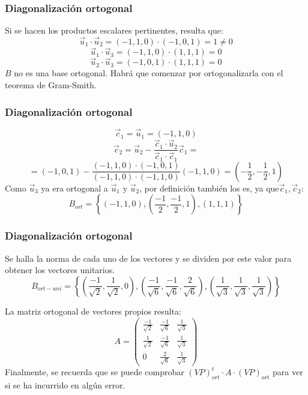 \documentclass{beamer}
\begin{document}
\begin{frame}
\frametitle{Diagonalizaci\'on ortogonal}
Si se hacen los productos escalares pertinentes, resulta que:
\[\vec u_1 \cdot \vec u_2 = (-1,1,0)\cdot (-1,0,1) = 1\neq 0\]
\[\vec u_1 \cdot \vec u_3 = (-1,1,0)\cdot (1,1,1) = 0\]
\[\vec u_2 \cdot \vec u_3 = (-1,0,1)\cdot (1,1,1) = 0\]
$B$ no es una base ortogonal. Habr\'a que comenzar por ortogonalizarla con el teorema de Gram-Smith.

\end{frame}



\begin{frame}
\frametitle{Diagonalizaci\'on ortogonal}
\[\vec c_1 = \vec u_1 = (-1,1,0)\]
\[\vec c_2 = \vec u_2  - \frac{\vec c_1\cdot \vec u_2}{\vec c_1\cdot \vec c_1} \vec c_1 = \]
\[= (-1,0,1)- \frac{(-1,1,0)\cdot (-1,0,1)}{(-1,1,0)\cdot(-1,1,0)}(-1,1,0) = \left(-\frac{1}{2},-\frac{1}{2},1 \right)\]
Como $\vec u_3$ ya era ortogonal a $\vec u_1$ y $\vec u_2$, por definici\'on tambi\'en los es, ya que$\vec c_1, \vec c_2$:
\[B_{ort} = \left\{(-1,1,0), \left( \frac{-1}{2}, \frac{-1}{2},1 \right), (1,1,1) \right\} \]
\end{frame}



\begin{frame}
\frametitle{Diagonalizaci\'on ortogonal}
Se halla la norma de cada uno de los vectores y se dividen por este valor para obtener los vectores unitarios.
\[B_{ort-uni} = \left\{(\frac{-1}{\sqrt 2},\frac{1}{\sqrt 2},0), \left( \frac{-1}{\sqrt 6},\frac{-1}{\sqrt 6},\frac{2}{\sqrt 6} \right), (\frac{1}{\sqrt 3},\frac{1}{\sqrt 3},\frac{1}{\sqrt 3}) \right\} \]



La matriz ortogonal de vectores propios resulta:
\[A=\left(\begin{array}{ccc}\frac{-1}{\sqrt 2} & \frac{-1}{\sqrt 6} & \frac{1}{\sqrt 3} \\\frac{1}{\sqrt 2} & \frac{-1}{\sqrt 6} & \frac{1}{\sqrt 3} \\0 & \frac{2}{\sqrt 6} & \frac{1}{\sqrt 3}\end{array}\right)\]
Finalmente, se recuerda que se puede comprobar $(VP)_{ort}^t\cdot A \cdot (VP)_{ort}$ para ver si se ha incurrido en alg\'un error. 


\end{frame}


\end{document}
